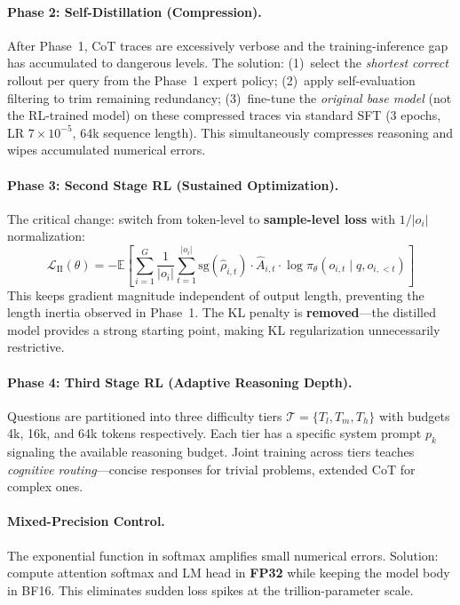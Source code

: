 \documentclass[11pt,a4paper]{article}
\begin{document}
\paragraph{Phase 2: Self-Distillation (Compression).} After Phase~1, CoT traces are excessively verbose and the training-inference gap has accumulated to dangerous levels. The solution: (1)~select the \emph{shortest correct} rollout per query from the Phase~1 expert policy; (2)~apply self-evaluation filtering to trim remaining redundancy; (3)~fine-tune the \emph{original base model} (not the RL-trained model) on these compressed traces via standard SFT (3 epochs, LR $7 \times 10^{-5}$, 64k sequence length). This simultaneously compresses reasoning and wipes accumulated numerical errors.

\paragraph{Phase 3: Second Stage RL (Sustained Optimization).} The critical change: switch from token-level to \textbf{sample-level loss} with $1/|o_i|$ normalization:
\[
\mathcal{L}_{\mathrm{II}}(\theta) = -\mathbb{E}\!\left[\sum_{i=1}^{G} \frac{1}{|o_i|}\sum_{t=1}^{|o_i|} \mathrm{sg}(\hat{\rho}_{i,t}) \cdot \hat{A}_{i,t} \cdot \log \pi_\theta(o_{i,t} \mid q, o_{i,<t})\right]
\]
This keeps gradient magnitude independent of output length, preventing the length inertia observed in Phase~1. The KL penalty is \textbf{removed}---the distilled model provides a strong starting point, making KL regularization unnecessarily restrictive.

\paragraph{Phase 4: Third Stage RL (Adaptive Reasoning Depth).} Questions are partitioned into three difficulty tiers $\mathcal{T} = \{T_l, T_m, T_h\}$ with budgets 4k, 16k, and 64k tokens respectively. Each tier has a specific system prompt $p_k$ signaling the available reasoning budget. Joint training across tiers teaches \emph{cognitive routing}---concise responses for trivial problems, extended CoT for complex ones.

\paragraph{Mixed-Precision Control.} The exponential function in softmax amplifies small numerical errors. Solution: compute attention softmax and LM head in \textbf{FP32} while keeping the model body in BF16. This eliminates sudden loss spikes at the trillion-parameter scale.
\end{document}

